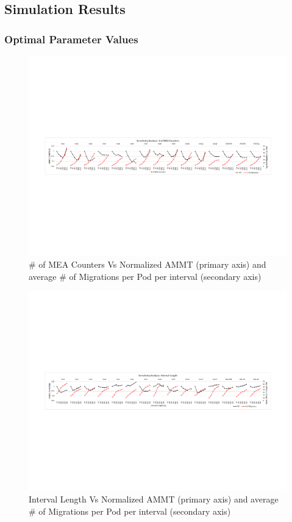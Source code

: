 \subsection{Simulation Results}
\label{sub:SimResults}

\subsubsection{Optimal Parameter Values}

\begin{figure}[t]
	\centering
  \includegraphics[width=\textwidth]{figures/num_counters_normalized.pdf}
  \caption{\# of MEA Counters Vs Normalized AMMT (primary axis) and average \# of Migrations per Pod per interval (secondary axis)}
  \label{fig:num_counters}
\end{figure}


\begin{figure}[t]
  \includegraphics[width=\textwidth]{figures/interval_length_normalized.pdf}
  \caption{Interval Length Vs Normalized AMMT (primary axis) and average \# of Migrations per Pod per interval (secondary axis)}
  \label{fig:interval}
\end{figure}

